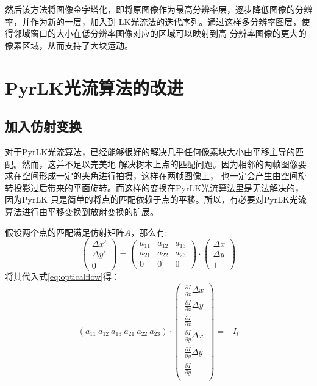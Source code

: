 然后该方法将图像金字塔化，即将原图像作为最高分辨率层，逐步降低图像的分辨率，并作为新的一层，加入到
LK光流法的迭代序列。通过这样多分辨率图层，使得邻域窗口的大小在低分辨率图像对应的区域可以映射到高
分辨率图像的更大的像素区域，从而支持了大块运动。

\section{PyrLK光流算法的改进}
\label{subsec:revisedpyrlk}
\subsection{加入仿射变换}
对于PyrLK光流算法，已经能够很好的解决几乎任何像素块大小由平移主导的匹配。然而，这并不足以完美地
解决树木上点的匹配问题。因为相邻的两帧图像要求在空间形成一定的夹角进行拍摄，这样在两帧图像上，
也一定会产生由空间旋转投影过后带来的平面旋转。而这样的变换在PyrLK光流算法里是无法解决的，因为PyrLK
只是简单的将点的匹配依赖于点的平移。所以，有必要对PyrLK光流算法进行由平移变换到放射变换的扩展。

假设两个点的匹配满足仿射矩阵$A$，那么有:\\
\begin{equation}
	\left(
	\begin{array}{c}
		\Delta x'\\
		\Delta y'\\
		0
	\end{array}
	\right)
	=
	\left(
	\begin{array}{ccc}
		a_{11} & a_{12} & a_{13}\\
		a_{21} & a_{22} & a_{23}\\
				0 & 0 & 0
	\end{array}
	\right)
	\cdot
	\left(
	\begin{array}{c}
		\Delta x\\
		\Delta y\\
		1
	\end{array}
	\right)
\end{equation}
将其代入式\ref{eq:opticalflow}得：\\
\begin{equation}
	(a_{11}\ a_{12}\ a_{13}\ a_{21}\ a_{22}\ a_{23})\cdot
	\left(
	\begin{array}{c}
		\frac{\partial I}{\partial x}\Delta x\\
        \frac{\partial I}{\partial x}\Delta y\\
        \frac{\partial I}{\partial x}\\
        \frac{\partial I}{\partial y}\Delta x\\
        \frac{\partial I}{\partial y}\Delta y\\
        \frac{\partial I}{\partial y}\\
	\end{array}
	\right)
	=-I_t
\end{equation}

